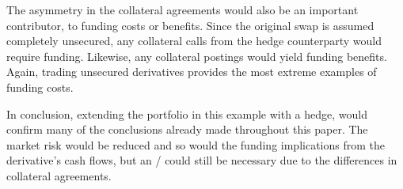 \documentclass[main.tex]{subfiles}
\begin{document}
        The asymmetry in the collateral agreements would also be an important contributor,
        to funding costs or benefits.
        Since the original swap is assumed completely unsecured, 
        any collateral calls from the hedge counterparty would require funding.
        Likewise, any collateral postings would yield funding benefits.
        Again, trading unsecured derivatives provides the most extreme examples of funding costs.

        In conclusion, extending the portfolio in this example with a hedge,
        would confirm many of the conclusions already made throughout this paper.
        The market risk would be reduced and so would the funding implications 
        from the derivative's cash flows,
        but an \FVA/ could still be necessary due to the differences in collateral agreements.
\end{document}
